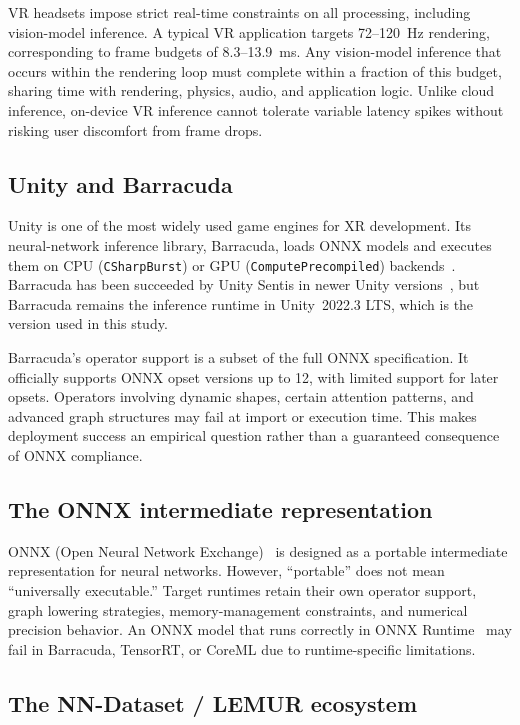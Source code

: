 \documentclass[10pt,twocolumn]{article}
\begin{document}
VR headsets impose strict real-time constraints on all processing, including vision-model inference. A typical VR application targets 72--120~Hz rendering, corresponding to frame budgets of 8.3--13.9~ms. Any vision-model inference that occurs within the rendering loop must complete within a fraction of this budget, sharing time with rendering, physics, audio, and application logic. Unlike cloud inference, on-device VR inference cannot tolerate variable latency spikes without risking user discomfort from frame drops.

\subsection{Unity and Barracuda}

Unity is one of the most widely used game engines for XR development. Its neural-network inference library, Barracuda, loads ONNX models and executes them on CPU (\texttt{CSharpBurst}) or GPU (\texttt{ComputePrecompiled}) backends~\cite{barracuda2022}. Barracuda has been succeeded by Unity Sentis in newer Unity versions~\cite{sentis2023}, but Barracuda remains the inference runtime in Unity~2022.3 LTS, which is the version used in this study.

Barracuda's operator support is a subset of the full ONNX specification. It officially supports ONNX opset versions up to 12, with limited support for later opsets. Operators involving dynamic shapes, certain attention patterns, and advanced graph structures may fail at import or execution time. This makes deployment success an empirical question rather than a guaranteed consequence of ONNX compliance.

\subsection{The ONNX intermediate representation}

ONNX (Open Neural Network Exchange)~\cite{onnx2019} is designed as a portable intermediate representation for neural networks. However, ``portable'' does not mean ``universally executable.'' Target runtimes retain their own operator support, graph lowering strategies, memory-management constraints, and numerical precision behavior. An ONNX model that runs correctly in ONNX Runtime~\cite{onnxruntime2019} may fail in Barracuda, TensorRT, or CoreML due to runtime-specific limitations.

\subsection{The NN-Dataset / LEMUR ecosystem}
\end{document}
